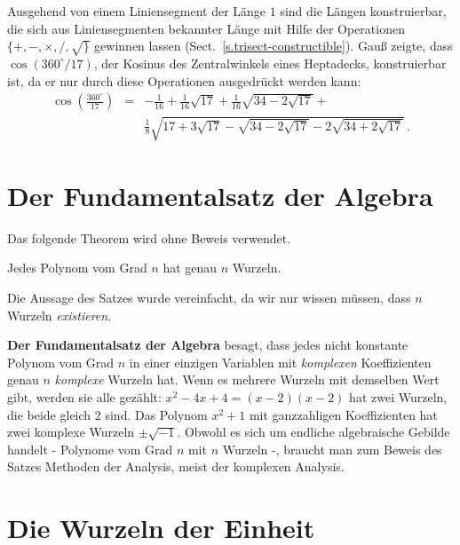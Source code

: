 Ausgehend von einem Liniensegment der Länge $1$ sind die Längen konstruierbar, die sich aus Liniensegmenten bekannter Länge mit Hilfe der Operationen $\{+,-,\times,/,\surd\}$ gewinnen lassen (Sect.~\ref{s.trisect-constructible}). Gauß zeigte, dass $\cos(360^\circ/17)$, der Kosinus des Zentralwinkels eines Heptadecks, konstruierbar ist, da er nur durch diese Operationen ausgedrückt werden kann:
\begin{eqnarray*}
\cos\left(\frac{360^\circ}{17}\right) &=& 
-\frac{1}{16}+\frac{1}{16}\sqrt{17} + 
     \frac{1}{16}\sqrt{34-2\sqrt{17}}
    + \\
    &&
     \frac{1}{8}\sqrt{
     17+3\sqrt{17} - 
     \sqrt{34-2\sqrt{17}}
   -2
     \sqrt{34+2\sqrt{17}}
   }\,.
\end{eqnarray*}

\section{Der Fundamentalsatz der Algebra}\label{s.fundamental}

Das folgende Theorem wird ohne Beweis verwendet.

\begin{theorem}\label{thm.fundamental} Jedes Polynom vom Grad $n$ hat genau $n$ Wurzeln.
\end{theorem}

Die Aussage des Satzes wurde vereinfacht, da wir nur wissen müssen, dass $n$ Wurzeln \emph{existieren}.

\smallskip

\begin{advanced}
\textbf{Der Fundamentalsatz der Algebra} besagt, dass jedes nicht konstante Polynom vom Grad $n$ in einer einzigen Variablen mit \emph{komplexen} Koeffizienten genau $n$ \emph{komplexe} Wurzeln hat. 
Wenn es mehrere Wurzeln mit demselben Wert gibt, werden sie alle gezählt: $x^2-4x+4=(x-2)(x-2)$ hat zwei Wurzeln, die beide gleich $2$ sind.
Das Polynom $x^2+1$ mit ganzzahligen Koeffizienten hat zwei komplexe Wurzeln $\pm\sqrt{-1}$.
Obwohl es sich um endliche algebraische Gebilde handelt - Polynome vom Grad $n$ mit $n$ Wurzeln -, braucht man zum Beweis des Satzes Methoden der Analysis, meist der komplexen Analysis.
\end{advanced}

\section{Die Wurzeln der Einheit}\label{s.roots}

